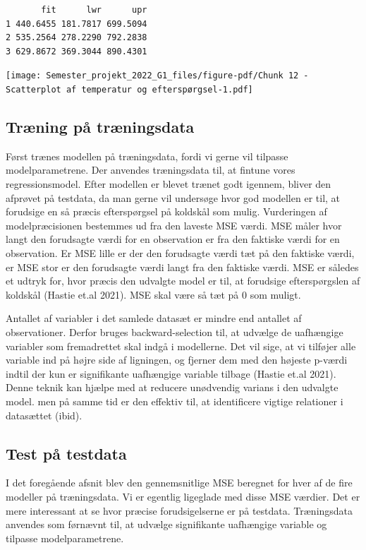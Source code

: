\documentclass[
  12pt,
  a4paper,
  DIV=11,
  numbers=noendperiod]{scrartcl}
\begin{document}
\begin{verbatim}
       fit      lwr      upr
1 440.6455 181.7817 699.5094
2 535.2564 278.2290 792.2838
3 629.8672 369.3044 890.4301
\end{verbatim}

\texttt{[image: Semester\_projekt\_2022\_G1\_files/figure-pdf/Chunk 12 - Scatterplot af temperatur og efterspørgsel-1.pdf]}

\hypertarget{truxe6ning-puxe5-truxe6ningsdata}{%
\subsection{Træning på
træningsdata}\label{truxe6ning-puxe5-truxe6ningsdata}}

Først trænes modellen på træningsdata, fordi vi gerne vil tilpasse
modelparametrene. Der anvendes træningsdata til, at fintune vores
regressionsmodel. Efter modellen er blevet trænet godt igennem, bliver
den afprøvet på testdata, da man gerne vil undersøge hvor god modellen
er til, at forudsige en så præcis efterspørgsel på koldskål som mulig.
Vurderingen af modelpræcisionen bestemmes ud fra den laveste MSE værdi.
MSE måler hvor langt den forudsagte værdi for en observation er fra den
faktiske værdi for en observation. Er MSE lille er der den forudsagte
værdi tæt på den faktiske værdi, er MSE stor er den forudsagte værdi
langt fra den faktiske værdi. MSE er således et udtryk for, hvor præcis
den udvalgte model er til, at forudsige efterspørgslen af koldskål
(Hastie et.al 2021). MSE skal være så tæt på \(0\) som muligt.

Antallet af variabler i det samlede datasæt er mindre end antallet af
observationer. Derfor bruges backward-selection til, at udvælge de
uafhængige variabler som fremadrettet skal indgå i modellerne. Det vil
sige, at vi tilføjer alle variable ind på højre side af ligningen, og
fjerner dem med den højeste p-værdi indtil der kun er signifikante
uafhængige variable tilbage (Hastie et.al 2021). Denne teknik kan hjælpe
med at reducere unødvendig varians i den udvalgte model. men på samme
tid er den effektiv til, at identificere vigtige relationer i datasættet
(ibid).

\hypertarget{test-puxe5-testdata}{%
\subsection{Test på testdata}\label{test-puxe5-testdata}}

I det foregående afsnit blev den gennemsnitlige MSE beregnet for hver af
de fire modeller på træningsdata. Vi er egentlig ligeglade med disse MSE
værdier. Det er mere interessant at se hvor præcise forudsigelserne er
på testdata. Træningsdata anvendes som førnævnt til, at udvælge
signifikante uafhængige variable og tilpasse modelparametrene.
\end{document}
